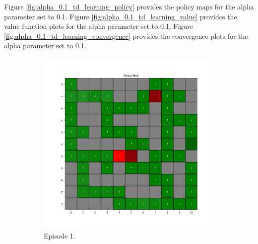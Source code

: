 \documentclass{assignment}
\begin{document}
Figure \ref{fig:alpha_0.1_td_learning_policy} provides the policy maps for the alpha parameter set to 0.1. Figure \ref{fig:alpha_0.1_td_learning_value} provides the value function plots for the alpha parameter set to 0.1. Figure \ref{fig:alpha_0.1_td_learning_convergence} provides the convergence plots for the alpha parameter set to 0.1.

\begin{figure}[H]
    \begin{subfigure}{0.3\textwidth}
        \includegraphics[width=\textwidth]{figures/policy_td/alpha_sweep/policy_alpha_0.1_gamma_0.95_epsilon_0.2_iteration_1.png}
    \caption{Episode 1.}
    \end{subfigure}\hfill
    \begin{subfigure}{0.3\textwidth}

\end{subfigure}
\end{figure}
\end{document}
